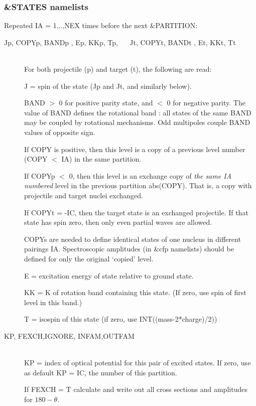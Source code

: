 \documentclass[11pt]{article}
\begin{document}
\subsubsection{\&STATES namelists}
Repeated IA = 1,..,NEX times before the next \&PARTITION: 

\begin{description}

\item[Jp,  COPYp,  BANDp , Ep,  KKp, Tp, ~~ Jt,  COPYt, BANDt , Et,  KKt, Tt] ~\\
For both projectile (p) and target (t), the following are read:

J     = spin of the state (Jp and Jt, and similarly below).

BAND  $>$ 0 for positive parity state, and $<$ 0 for negative parity.
The value of BAND defines the rotational band : all states of the
same BAND may be coupled by rotational mechanisms.
Odd multipoles couple BAND values of opposite sign.

If COPY is positive, then this level is a copy of a
previous level number (COPY $<$ IA) in the same partition.

If COPYp $<$ 0, then this level is an exchange copy of
{\em the same IA numbered}
level in the previous partition abs(COPY).
That is, a copy with projectile and target nuclei exchanged.

If COPYt = -IC, then the target state is an exchanged projectile.
If that state has spin zero, then only even partial waves are allowed.

COPYs are needed to define identical states of one nucleus in different
pairings IA.   Spectroscopic amplitudes (in \&cfp namelists) should be defined
for only the original `copied' level.

E     = excitation energy of state relative to ground state.

KK     = K of rotation band containing this state.
(If zero, use spin of first level in this band.)

T     = isospin of this state (if zero, use INT((mass-2*charge)/2))

\item[KP, FEXCH,IGNORE, INFAM,OUTFAM] ~\\
KP = index of optical potential for this pair of excited states.
If zero, use as default KP = IC, the number of this partition.

If FEXCH = T calculate and write out all cross sections and amplitudes
for $180-\theta$.



\end{description}
\end{document}
